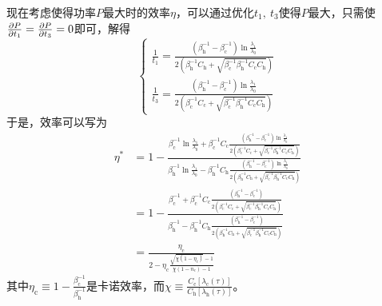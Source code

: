 现在考虑使得功率$P$最大时的效率$\eta$，可以通过优化$t_1,\ t_3$使得$P$最大，只需使$\frac{\partial P}{\partial t_1}=\frac{\partial P}{\partial t_3}=0$即可，解得
\begin{equation}
    \left\{\begin{aligned}
        \frac{1}{t_{1}}=\frac{\left(\beta_{\mathrm{h}}^{-1}-\beta_{\mathrm{c}}^{-1}\right) \ln \frac{\lambda_{1}}{\lambda_{0}}}{2\left(\beta_{\mathrm{h}}^{-1} C_{\mathrm{h}}+\sqrt{\beta_{\mathrm{c}}^{-1} \beta_{\mathrm{h}}^{-1} C_{\mathrm{c}} C_{\mathrm{h}}}\right)}\\
        \frac{1}{t_{3}}=\frac{\left(\beta_{\mathrm{h}}^{-1}-\beta_{\mathrm{c}}^{-1}\right) \ln \frac{\lambda_{1}}{\lambda_{0}}}{2\left(\beta_{\mathrm{c}}^{-1} C_{\mathrm{c}}+\sqrt{\beta_{\mathrm{c}}^{-1} \beta_{\mathrm{h}}^{-1} C_{\mathrm{c}} C_{\mathrm{h}}}\right)}
    \end{aligned}\right.
    \label{eq3.36}
\end{equation}
于是，效率可以写为
\begin{equation}
    \begin{split}
        \eta^{*}&=1- \frac{\beta_{\mathrm{c}}^{-1} \ln{\frac{\lambda_1}{\lambda_0}} + \beta_{\mathrm{c}}^{-1} C_{\mathrm{c}} \frac{\left(\beta_{\mathrm{h}}^{-1}-\beta_{\mathrm{c}}^{-1}\right) \ln \frac{\lambda_{1}}{\lambda_{0}}}{2\left(\beta_{\mathrm{c}}^{-1} C_{\mathrm{c}}+\sqrt{\beta_{\mathrm{c}}^{-1} \beta_{\mathrm{h}}^{-1} C_{\mathrm{c}} C_{\mathrm{h}}}\right)}}{\beta_{\mathrm{h}}^{-1} \ln{\frac{\lambda_1}{\lambda_0}} - \beta_{\mathrm{h}}^{-1} C_{\mathrm{h}} \frac{\left(\beta_{\mathrm{h}}^{-1}-\beta_{\mathrm{c}}^{-1}\right) \ln \frac{\lambda_{1}}{\lambda_{0}}}{2\left(\beta_{\mathrm{h}}^{-1} C_{\mathrm{h}}+\sqrt{\beta_{\mathrm{c}}^{-1} \beta_{\mathrm{h}}^{-1} C_{\mathrm{c}} C_{\mathrm{h}}}\right)}}\\
        &=1- \frac{\beta_{\mathrm{c}}^{-1}  + \beta_{\mathrm{c}}^{-1} C_{\mathrm{c}} \frac{\left(\beta_{\mathrm{h}}^{-1}-\beta_{\mathrm{c}}^{-1}\right) }{2\left(\beta_{\mathrm{c}}^{-1} C_{\mathrm{c}}+\sqrt{\beta_{\mathrm{c}}^{-1} \beta_{\mathrm{h}}^{-1} C_{\mathrm{c}} C_{\mathrm{h}}}\right)}}{\beta_{\mathrm{h}}^{-1}  - \beta_{\mathrm{h}}^{-1} C_{\mathrm{h}} \frac{\left(\beta_{\mathrm{h}}^{-1}-\beta_{\mathrm{c}}^{-1}\right) }{2\left(\beta_{\mathrm{h}}^{-1} C_{\mathrm{h}}+\sqrt{\beta_{\mathrm{c}}^{-1} \beta_{\mathrm{h}}^{-1} C_{\mathrm{c}} C_{\mathrm{h}}}\right)}}\\
        &=\frac{\eta_{\mathrm{c}}}{2-\eta_{\mathrm{c}} \frac{\sqrt{\chi\left(1-\eta_{\mathrm{c}}\right)}-1}{\chi\left(1-n_{\mathrm{c}}\right)-1}}
    \end{split}
    \label{eq3.37}
\end{equation}
其中$\eta_{\mathrm{c}}\equiv 1-\frac{\beta_{\mathrm{c}}^{-1}}{\beta_{\mathrm{h}}^{-1}}$是卡诺效率，而$\chi\equiv\frac{C_{\mathrm{c}} [\lambda_{\mathrm{c}}(\tau)]}{C_{\mathrm{h}} [\lambda_{\mathrm{h}}(\tau)]}$。

